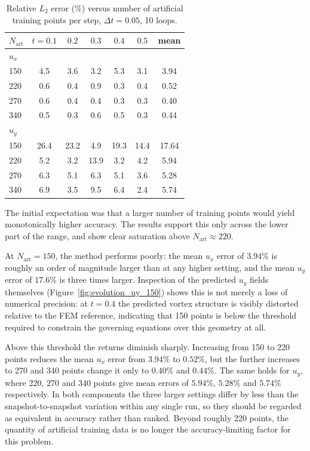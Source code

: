 \documentclass[11pt, a4paper]{report}
\begin{document}
\begin{table}[H]
\centering
\caption{Relative \(L_2\) error (\%) versus number of artificial training points per
step, \(\Delta t = 0.05\), 10 loops.}
\label{tab:npoints}
\begin{tabular}{l|ccccc|c}
\hline
\(N_{\mathrm{art}}\) & \(t=0.1\) & \(0.2\) & \(0.3\) & \(0.4\) & \(0.5\) & mean \\
\hline
\multicolumn{7}{l}{\(u_x\)} \\
\hline
150 & 4.5 & 3.6 & 3.2 & 5.3 & 3.1 & 3.94 \\
220 & 0.6 & 0.4 & 0.9 & 0.3 & 0.4 & 0.52 \\
270 & 0.6 & 0.4 & 0.4 & 0.3 & 0.3 & 0.40 \\
340 & 0.5 & 0.3 & 0.6 & 0.5 & 0.3 & 0.44 \\
\hline
\multicolumn{7}{l}{\(u_y\)} \\
\hline
150 & 26.4 & 23.2 & 4.9 & 19.3 & 14.4 & 17.64 \\
220 & 5.2 & 3.2 & 13.9 & 3.2 & 4.2 & 5.94 \\
270 & 6.3 & 5.1 & 6.3 & 5.1 & 3.6 & 5.28 \\
340 & 6.9 & 3.5 & 9.5 & 6.4 & 2.4 & 5.74 \\
\hline
\end{tabular}
\end{table}
The initial expectation was that a larger number of training points would yield
monotonically higher accuracy. The results support this only across the lower part
of the range, and show clear saturation above \(N_{\mathrm{art}} \approx 220\).

At \(N_{\mathrm{art}} = 150\), the method performs poorly: the mean \(u_x\) error of
\(3.94\%\) is roughly an order of magnitude larger than at any higher setting, and
the mean \(u_y\) error of \(17.6\%\) is three times larger. Inspection of the
predicted \(u_y\) fields themselves (Figure~\ref{fig:evolution_uy_150}) shows this is
not merely a loss of numerical precision: at \(t=0.4\) the predicted vortex structure
is visibly distorted relative to the FEM reference, indicating that 150 points is
below the threshold required to constrain the governing equations over this geometry
at all.

Above this threshold the returns diminish sharply. Increasing from 150 to 220 points
reduces the mean \(u_x\) error from \(3.94\%\) to \(0.52\%\), but the further
increases to 270 and 340 points change it only to \(0.40\%\) and \(0.44\%\). The same
holds for \(u_y\), where 220, 270 and 340 points give mean errors of \(5.94\%\),
\(5.28\%\) and \(5.74\%\) respectively. In both components the three larger settings
differ by less than the snapshot-to-snapshot variation within any single run, so they
should be regarded as equivalent in accuracy rather than ranked. Beyond roughly 220
points, the quantity of artificial training data is no longer the accuracy-limiting
factor for this problem.
\end{document}
